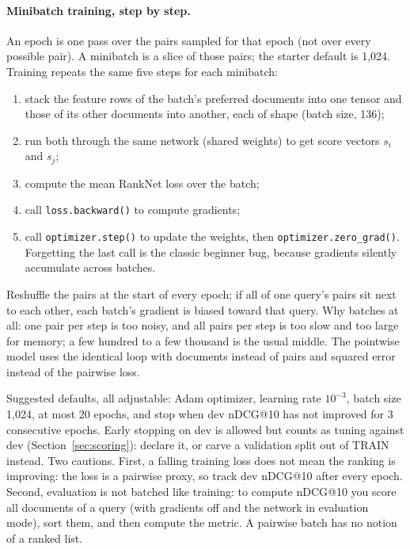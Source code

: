 \documentclass[10pt]{article}
\begin{document}
\paragraph{Minibatch training, step by step.}
An epoch is one pass over the pairs sampled for that epoch (not over every possible pair). A minibatch is a slice of those pairs; the starter default is 1{,}024. Training repeats the same five steps for each minibatch:
\begin{enumerate}
  \item stack the feature rows of the batch's preferred documents into one tensor and those of its other documents into another, each of shape (batch size, 136);
  \item run both through the same network (shared weights) to get score vectors \(s_i\) and \(s_j\);
  \item compute the mean RankNet loss over the batch;
  \item call \texttt{loss.backward()} to compute gradients;
  \item call \texttt{optimizer.step()} to update the weights, then \texttt{optimizer.zero\_grad()}. Forgetting the last call is the classic beginner bug, because gradients silently accumulate across batches.
\end{enumerate}
Reshuffle the pairs at the start of every epoch; if all of one query's pairs sit next to each other, each batch's gradient is biased toward that query. Why batches at all: one pair per step is too noisy, and all pairs per step is too slow and too large for memory; a few hundred to a few thousand is the usual middle. The pointwise model uses the identical loop with documents instead of pairs and squared error instead of the pairwise loss.

Suggested defaults, all adjustable: Adam optimizer, learning rate \(10^{-3}\), batch size 1{,}024, at most 20 epochs, and stop when dev nDCG@10 has not improved for 3 consecutive epochs. Early stopping on dev is allowed but counts as tuning against dev (Section~\ref{sec:scoring}): declare it, or carve a validation split out of TRAIN instead. Two cautions. First, a falling training loss does not mean the ranking is improving: the loss is a pairwise proxy, so track dev nDCG@10 after every epoch. Second, evaluation is not batched like training: to compute nDCG@10 you score all documents of a query (with gradients off and the network in evaluation mode), sort them, and then compute the metric. A pairwise batch has no notion of a ranked list.
\end{document}
